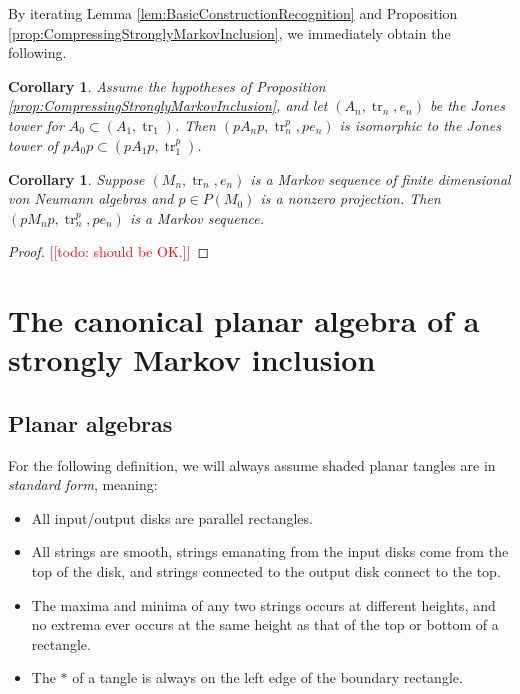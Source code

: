 \documentclass[11pt]{article}
\theoremstyle{plain}
\newtheorem{cor}[thm]{Corollary}
\theoremstyle{definition}
\DeclareMathOperator{\tr}{tr}
\newcommand{\nn}[1]{\textcolor{red}{[[#1]]}}
\begin{document}
By iterating Lemma \ref{lem:BasicConstructionRecognition} and Proposition \ref{prop:CompressingStronglyMarkovInclusion}, we immediately obtain the following.

\begin{cor}
Assume the hypotheses of Proposition \ref{prop:CompressingStronglyMarkovInclusion}, and let $(A_n, \tr_n, e_n)$ be the Jones tower for $A_0 \subset (A_1, \tr_1)$.
Then $(pA_np, \tr_n^p, pe_n)$ is isomorphic to the Jones tower of $pA_0p \subset (pA_1p, \tr_1^p)$.
\end{cor}


\begin{cor}
Suppose $(M_n,\tr_n, e_n)$ is a Markov sequence of finite dimensional von Neumann algebras and $p\in P(M_0)$ is a nonzero projection.
Then $(pM_np, \tr_n^p, pe_n)$ is a Markov sequence.
\end{cor}
\begin{proof}
\nn{todo: should be OK.}
\end{proof}


\section{The canonical planar algebra of a strongly Markov inclusion} 
\label{sec:StronglyMarkovPA}


\subsection{Planar algebras} \label{CanonPA}



For the following definition, we will always assume shaded planar tangles are in \textit{standard form}, meaning:
\begin{itemize}
\item All input/output disks are parallel rectangles.
\item All strings are smooth, strings emanating from the input disks come from the top of the disk, and strings connected to the output disk connect to the top.
\item The maxima and minima of any two strings occurs at different heights, and no extrema ever occurs at the same height as that of the top or bottom of a rectangle.
\item The $\ast$ of a tangle is always on the left edge of the boundary rectangle.
\end{itemize}
\end{document}
